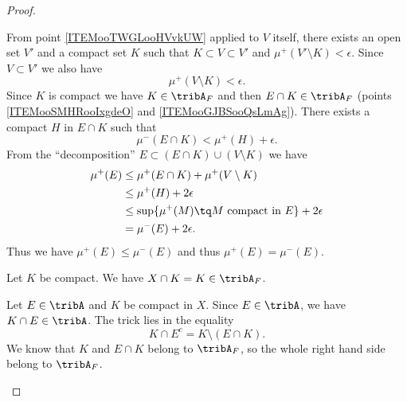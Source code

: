 \begin{proof}
\begin{subproof}
            From point \ref{ITEMooTWGLooHVvkUW} applied to \( V\) itself, there exists an open set \( V' \) and a compact set \( K\) such that \( K\subset V\subset V'\) and \( \mu^+(V'\setminus K)<\epsilon\). Since \( V\subset V'\) we also have
            \begin{equation}
                \mu^+(V\setminus K)<\epsilon.
            \end{equation}
            Since \( K\) is compact we have \( K\in \tribA_F\) and then \( E\cap K\in\tribA_F\) (points \ref{ITEMooSMHRooIxgdeO} and \ref{ITEMooGJBSooQsLmAg}). There exists a compact \( H\) in \( E\cap K\) such that
            \begin{equation}
                \mu^-(E\cap K)<\mu^+(H)+\epsilon.
            \end{equation}
            From the ``decomposition'' \( E\subset (E\cap K)\cup(V\setminus K)\) we have
            \begin{subequations}
                \begin{align}
                    \mu^+(E)&\leq \mu^+(E\cap K)+\mu^+(V\setminus K)\\
                    &\leq \mu^+(H)+2\epsilon\\
                    &\leq \sup\{ \mu^+(M)\tq \text{\( M\) compact in \( E\)} \}+2\epsilon\\
                    &=\mu^-(E)+2\epsilon.
                \end{align}
            \end{subequations}
            Thus we have \( \mu^+(E)\leq \mu^-(E)\) and thus \( \mu^+(E)=\mu^-(E)\).

            \spitem[\( X\in\tribA\)]        \label{ITEMooOQZLooMqPYTP}
             
            Let \( K\) be compact. We have \( X\cap K=K\in \tribA_F\).

                   \label{ITEMooCJRFooJAEZIV}

            Let \( E\in \tribA\) and \( K\) be compact in \( X\). Since \( E\in\tribA\), we have \( K\cap E\in\tribA\). The trick lies in the equality
            \begin{equation}
                K\cap E^c=K\setminus(E\cap K).
            \end{equation}
            We know that  \( K\) and \( E\cap K\) belong to \( \tribA_F\), so the whole right hand side belong to \( \tribA_F\).


\end{subproof}
\end{proof}
